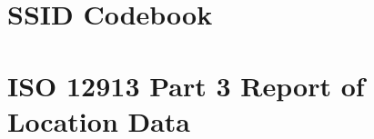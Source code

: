 \documentclass[twoside,fontsize=12pt,titlepage,chapterprefix=true
]{scrbook}
\begin{document}
\chapter{SSID Codebook}\label{app:codebook}


\chapter{ISO 12913 Part 3 Report of Location Data}\label{app:location-data}


% 





%  





\end{document}
